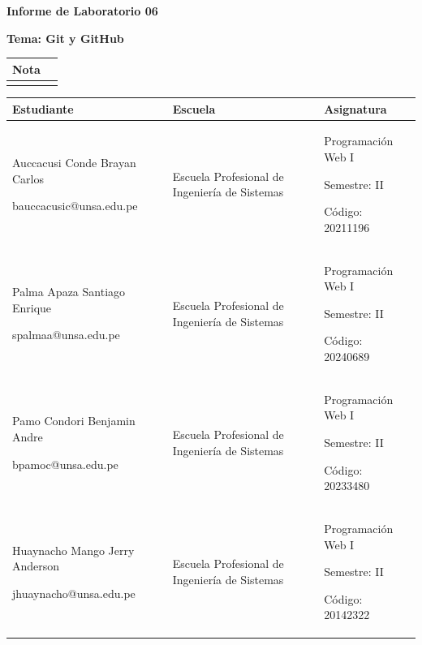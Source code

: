 \documentclass{article}
\newcommand{\itemCourse}{Programación Web I}
\newcommand{\itemSemester}{II}
\newcommand{\itemSchool}{Escuela Profesional de Ingeniería de Sistemas}
\newcommand{\itemPracticeNumber}{06}
\newcommand{\itemTheme}{Git y GitHub}
\begin{document}
	
	\vspace*{10px}
	
	\begin{center}	
		\fontsize{17}{17} \textbf{ Informe de Laboratorio \itemPracticeNumber}
	\end{center}
	\centerline{\textbf{\Large Tema: \itemTheme}}

	\begin{flushright}
		\begin{tabular}{|M{2.5cm}|N|}
			\hline 
			\color{white} \textbf{Nota}  \\
			\hline 
			     \\[30pt]
			\hline 			
		\end{tabular}
	\end{flushright}	

    \begin{table}[H]
    	\begin{tabular}{|x{4.7cm}|x{4.8cm}|x{4.8cm}|}
    		\hline 
    		\color{white} \textbf{Estudiante} & \color{white}\textbf{Escuela}  & \color{white}\textbf{Asignatura}   \\
    		\hline 
    		{Auccacusi Conde Brayan Carlos \par bauccacusic@unsa.edu.pe} & \itemSchool & {\itemCourse \par Semestre: \itemSemester \par Código: 20211196}     \\
    		\hline 
    		{Palma Apaza Santiago Enrique \par spalmaa@unsa.edu.pe} & \itemSchool & {\itemCourse \par Semestre: \itemSemester \par Código:  20240689}     \\
            \hline 
    		{Pamo Condori Benjamin Andre \par bpamoc@unsa.edu.pe} & \itemSchool & {\itemCourse \par Semestre: \itemSemester \par Código: 20233480}     \\
    		\hline
    		{Huaynacho Mango Jerry Anderson \par jhuaynacho@unsa.edu.pe} & \itemSchool & {\itemCourse \par Semestre: \itemSemester \par Código: 20142322}     \\
    		\hline
    	\end{tabular}
    \end{table}
\end{document}
